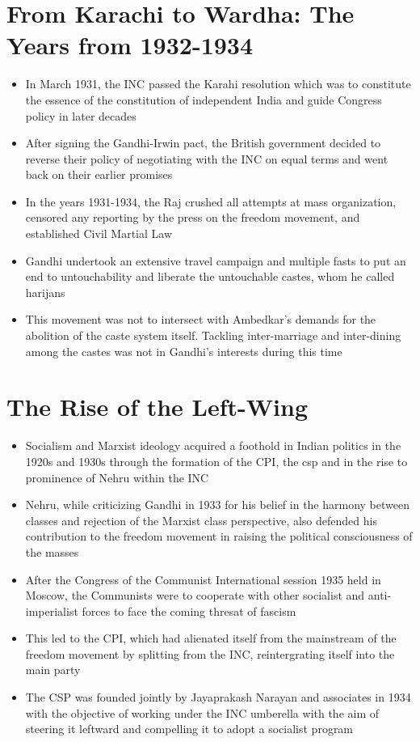 \section{From Karachi to Wardha: The Years from 1932-1934}
\begin{itemize}
    \item In March 1931, the INC passed the Karahi resolution which was to constitute the essence of the constitution of independent India and guide Congress policy in later decades
    \item After signing the Gandhi-Irwin pact, the British government decided to reverse their policy of negotiating with the INC on equal terms and went back on their earlier promises
    \item In the years 1931-1934, the Raj crushed all attempts at mass organization, censored any reporting by the press on the freedom movement, and established Civil Martial Law
    \item Gandhi undertook an extensive travel campaign and multiple fasts to put an end to untouchability and liberate the untouchable castes, whom he called \Glspl{harijan}
    \item This movement was not to intersect with Ambedkar's demands for the abolition of the caste system itself. Tackling inter-marriage and inter-dining among the castes was not in Gandhi's interests during this time
\end{itemize}

\section{The Rise of the Left-Wing}
\begin{itemize}
    \item Socialism and Marxist ideology acquired a foothold in Indian politics in the 1920s and 1930s through the formation of the CPI, the \gls{csp} and in the rise to prominence of Nehru within the INC
    \item Nehru, while criticizing Gandhi in 1933 for his belief in the harmony between classes and rejection of the Marxist class perspective, also defended his contribution to the freedom movement in raising the political consciousness of the masses
    \item After the Congress of the Communist International session 1935 held in Moscow, the Communists were to cooperate with other socialist and anti-imperialist forces to face the coming thresat of fascism
    \item This led to the CPI, which had alienated itself from the mainstream of the freedom movement by splitting from the INC, reintergrating itself into the main party
    \item The CSP was founded jointly by Jayaprakash Narayan and associates in 1934 with the objective of working under the INC umberella with the aim of steering it leftward and compelling it to adopt a socialist program
\end{itemize}

